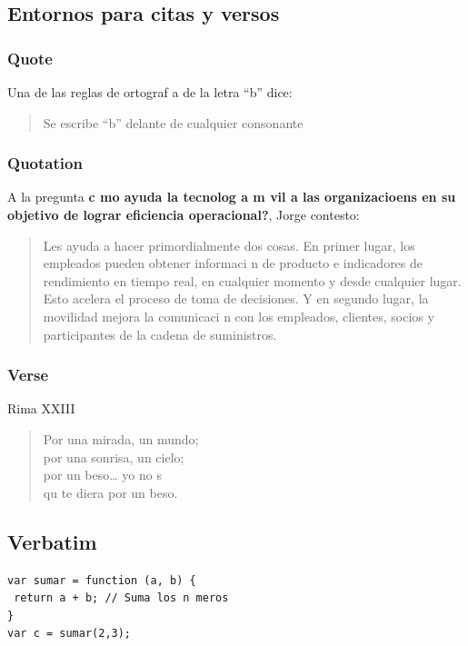 \documentclass{article}
\begin{document}
\subsection{Entornos para citas y versos}
\label{sec:entornoscitasyversos}

\subsubsection{Quote}
\label{sec:quote}

Una de las reglas de ortograf a de la letra ``b'' dice:
\begin{quote}
  Se escribe ``b'' delante de cualquier consonante
\end{quote}

\subsubsection{Quotation}
\label{sec:quotation}

A la pregunta \textbf{ c mo ayuda la tecnolog a m vil a las organizacioens en su objetivo de lograr eficiencia operacional?}, Jorge contesto:
\begin{quotation}
  Les ayuda a hacer primordialmente dos cosas.
En primer lugar, los empleados pueden obtener informaci n de producto e indicadores de rendimiento en tiempo real, en cualquier momento y desde cualquier lugar. Esto acelera el proceso de toma de decisiones.
Y en segundo lugar, la movilidad mejora la comunicaci n con los empleados, clientes, socios y participantes de la cadena de suministros.
\end{quotation}

\subsubsection{Verse}
\label{sec:verse}

\large Rima XXIII
\normalsize
\begin{verse}
  Por una mirada, un mundo;\\
  por una sonrisa, un cielo;\\
  por un beso\ldots{} yo no s \\
  qu  te diera por un beso.
\end{verse}

\subsection{Verbatim}
\label{sec:verbatim}
\scriptsize
\begin{verbatim}
var sumar = function (a, b) {
 return a + b; // Suma los n meros
}
var c = sumar(2,3);
\end{verbatim}
\normalsize
\end{document}
